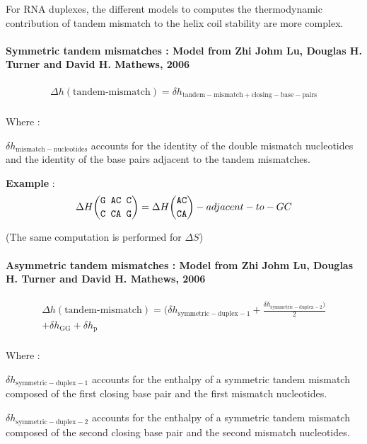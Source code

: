 \documentclass{article}
\begin{document}
For RNA duplexes, the different models to computes the thermodynamic contribution of tandem mismatch to the helix coil 
stability are more complex.

\paragraph{Symmetric tandem mismatches : \textbf{Model from Zhi Johm Lu, Douglas H. Turner and David H. Mathews, 2006}}

\begin{multline*}
\Delta h {(\mbox{tandem-mismatch})} = 
\delta{}h_\mathrm{tandem-mismatch+closing-base-pairs} \\
\end{multline*}

Where :

$\delta{}h_\mathrm{mismatch-nucleotides}$ accounts for the identity of the double mismatch nucleotides and the identity of the base pairs
adjacent to the tandem mismatches.

\textbf{Example} :
\begin{multline*}
\Delta H {\mbox{\texttt{G AC C}} \choose \mbox{\texttt{C CA G}}} = 
\Delta H {\mbox{\texttt{AC}} \choose \mbox{\texttt{CA}}} -adjacent-to-GC\\
\end{multline*}

       (The same computation is performed for $\Delta S$)    

\paragraph{Asymmetric tandem mismatches : \textbf{Model from Zhi Johm Lu, Douglas H. Turner and David H. Mathews, 2006}}

\begin{multline*}
\Delta h {(\mbox{tandem-mismatch})} =
( \delta{}h_\mathrm{symmetric-duplex-1} +
\frac{\delta{}h_\mathrm{symmetric-duplex-2} )}{2} \\ +
\delta{}h_\mathrm{GG} +
\delta{}h_\mathrm{p}\\
\end{multline*}

Where :

$\delta{}h_\mathrm{symmetric-duplex-1}$ accounts for the enthalpy of a symmetric tandem mismatch composed of
the first closing base pair and the first mismatch nucleotides.

$\delta{}h_\mathrm{symmetric-duplex-2}$ accounts for the enthalpy of a symmetric tandem mismatch composed of
the second closing base pair and the second mismatch nucleotides.
\end{document}
